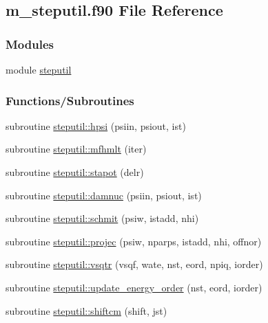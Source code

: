 \hypertarget{m__steputil_8f90}{}\subsection{m\+\_\+steputil.\+f90 File Reference}
\label{m__steputil_8f90}
\subsubsection*{Modules}
\begin{DoxyCompactItemize}
\item 
module \hyperlink{namespacesteputil}{steputil}
\end{DoxyCompactItemize}
\subsubsection*{Functions/\+Subroutines}
\begin{DoxyCompactItemize}
\item 
subroutine \hyperlink{namespacesteputil_a090a1e879764ac3c51935936ec1e543a}{steputil\+::hpsi} (psiin, psiout, ist)
\item 
subroutine \hyperlink{namespacesteputil_a3c17955fc42e7195ed0dc067ae7d4d6e}{steputil\+::mfhmlt} (iter)
\item 
subroutine \hyperlink{namespacesteputil_a30dc844e256bb5ef44421ff7b07986fd}{steputil\+::stapot} (delr)
\item 
subroutine \hyperlink{namespacesteputil_a20a1c0c92f1a1d4376d1c754c1c83f92}{steputil\+::damnuc} (psiin, psiout, ist)
\item 
subroutine \hyperlink{namespacesteputil_a3f24213fc5023f4b0a3e64d1f70fb652}{steputil\+::schmit} (psiw, istadd, nhi)
\item 
subroutine \hyperlink{namespacesteputil_afe0714411fd5aaa69584a546ee60a10d}{steputil\+::projec} (psiw, nparps, istadd, nhi, offnor)
\item 
subroutine \hyperlink{namespacesteputil_ae78e72bb6f13ff85000ad2d77a5440e8}{steputil\+::vsqtr} (vsqf, wate, nst, eord, npiq, iorder)
\item 
subroutine \hyperlink{namespacesteputil_aeb44d61e037e38d8dc26014c59214b44}{steputil\+::update\+\_\+energy\+\_\+order} (nst, eord, iorder)
\item 
subroutine \hyperlink{namespacesteputil_a41150572a8cf8a08b73a8d157011ac4e}{steputil\+::shiftcm} (shift, jst)
\end{DoxyCompactItemize}
